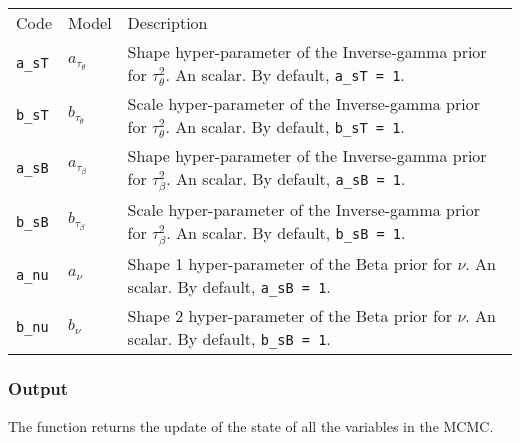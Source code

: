 \documentclass[
]{article}
\begin{document}
\begin{longtable}[]{@{}
  >{\raggedleft\arraybackslash}p{}
  >{\centering\arraybackslash}p{}
  >{\raggedright\arraybackslash}p{}@{}}
\toprule\noalign{}
\endhead
\bottomrule\noalign{}
\endlastfoot
Code & Model & Description \\
\texttt{a\_sT} & \(a_{\tau_\theta}\) & Shape hyper-parameter of the Inverse-gamma prior for
\(\tau_\theta^2\). An scalar. By default, \texttt{a\_sT\ =\ 1}. \\
\texttt{b\_sT} & \(b_{\tau_\theta}\) & Scale hyper-parameter of the Inverse-gamma prior for
\(\tau_\theta^2\). An scalar. By default, \texttt{b\_sT\ =\ 1}. \\
\texttt{a\_sB} & \(a_{\tau_\beta}\) & Shape hyper-parameter of the Inverse-gamma prior for
\(\tau_\beta^2\). An scalar. By default, \texttt{a\_sB\ =\ 1}. \\
\texttt{b\_sB} & \(b_{\tau_\beta}\) & Scale hyper-parameter of the Inverse-gamma prior for
\(\tau_\beta^2\). An scalar. By default, \texttt{b\_sB\ =\ 1}. \\
\texttt{a\_nu} & \(a_{\nu}\) & Shape 1 hyper-parameter of the Beta prior for
\(\nu\). An scalar. By default, \texttt{a\_sB\ =\ 1}. \\
\texttt{b\_nu} & \(b_{\nu}\) & Shape 2 hyper-parameter of the Beta prior for
\(\nu\). An scalar. By default, \texttt{b\_sB\ =\ 1}. \\
\end{longtable}

\subsubsection{Output}\label{output-1}

The function returns the update of the state of all the variables in the MCMC.
\end{document}
